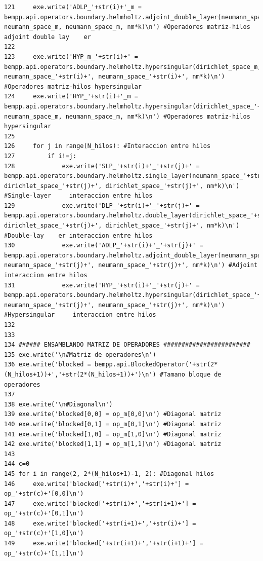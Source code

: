 \documentclass[12pt,letterpaper]{article}
\numberwithin{equation}{section}
\begin{document}
\begin{lstlisting}
121     exe.write('ADLP_'+str(i)+'_m = bempp.api.operators.boundary.helmholtz.adjoint_double_layer(neumann_space_'+str(i)+', neumann_space_m, neumann_space_m, nm*k)\n') #Operadores matriz-hilos adjoint double lay    er
122 
123     exe.write('HYP_m_'+str(i)+' = bempp.api.operators.boundary.helmholtz.hypersingular(dirichlet_space_m, neumann_space_'+str(i)+', neumann_space_'+str(i)+', nm*k)\n') #Operadores matriz-hilos hypersingular
124     exe.write('HYP_'+str(i)+'_m = bempp.api.operators.boundary.helmholtz.hypersingular(dirichlet_space_'+str(i)+', neumann_space_m, neumann_space_m, nm*k)\n') #Operadores matriz-hilos hypersingular
125 
126     for j in range(N_hilos): #Interaccion entre hilos
127         if i!=j:
128             exe.write('SLP_'+str(i)+'_'+str(j)+' = bempp.api.operators.boundary.helmholtz.single_layer(neumann_space_'+str(i)+', dirichlet_space_'+str(j)+', dirichlet_space_'+str(j)+', nm*k)\n') #Single-layer     interaccion entre hilos
129             exe.write('DLP_'+str(i)+'_'+str(j)+' = bempp.api.operators.boundary.helmholtz.double_layer(dirichlet_space_'+str(i)+', dirichlet_space_'+str(j)+', dirichlet_space_'+str(j)+', nm*k)\n') #Double-lay    er interaccion entre hilos
130             exe.write('ADLP_'+str(i)+'_'+str(j)+' = bempp.api.operators.boundary.helmholtz.adjoint_double_layer(neumann_space_'+str(i)+', neumann_space_'+str(j)+', neumann_space_'+str(j)+', nm*k)\n') #Adjoint     interaccion entre hilos
131             exe.write('HYP_'+str(i)+'_'+str(j)+' = bempp.api.operators.boundary.helmholtz.hypersingular(dirichlet_space_'+str(i)+', neumann_space_'+str(j)+', neumann_space_'+str(j)+', nm*k)\n') #Hypersingular     interaccion entre hilos
132 
133 
134 ###### ENSAMBLANDO MATRIZ DE OPERADORES ########################
135 exe.write('\n#Matriz de operadores\n')
136 exe.write('blocked = bempp.api.BlockedOperator('+str(2*(N_hilos+1))+','+str(2*(N_hilos+1))+')\n') #Tamano bloque de operadores
137 
138 exe.write('\n#Diagonal\n')
139 exe.write('blocked[0,0] = op_m[0,0]\n') #Diagonal matriz
140 exe.write('blocked[0,1] = op_m[0,1]\n') #Diagonal matriz
141 exe.write('blocked[1,0] = op_m[1,0]\n') #Diagonal matriz
142 exe.write('blocked[1,1] = op_m[1,1]\n') #Diagonal matriz
143 
144 c=0
145 for i in range(2, 2*(N_hilos+1)-1, 2): #Diagonal hilos
146     exe.write('blocked['+str(i)+','+str(i)+'] = op_'+str(c)+'[0,0]\n')
147     exe.write('blocked['+str(i)+','+str(i+1)+'] = op_'+str(c)+'[0,1]\n')
148     exe.write('blocked['+str(i+1)+','+str(i)+'] = op_'+str(c)+'[1,0]\n')
149     exe.write('blocked['+str(i+1)+','+str(i+1)+'] = op_'+str(c)+'[1,1]\n')

\end{lstlisting}
\end{document}
